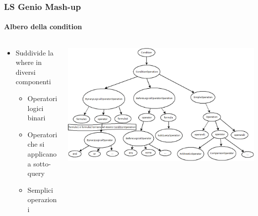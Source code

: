 \documentclass{beamer}
\begin{document}
\begin{frame}
	\frametitle{LS Genio Mash-up}
	\framesubtitle{Albero della condition}
	\begin{columns}[T] %
		\begin{column}{.26\textwidth}
			\begin{itemize}
				\tiny
				\item Suddivide la where in diversi componenti
				\begin{itemize}
					\tiny
					\item Operatori logici binari
					\item Operatori che si applicano a sotto-query
					\item Semplici operazioni
				\end{itemize}
				
			\end{itemize}
			
		\end{column}%
		\hfill%
		\begin{column}{.7\textwidth}
			\includegraphics[width=1\textwidth]{images/strutturaquerytree.png}
		\end{column}%
	\end{columns}
\end{frame}
\end{document}
